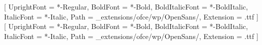 \usepackage{titlepic}
\usepackage{titling}
\usepackage{graphicx}
\usepackage{fancyhdr}
\usepackage{fontspec}
\usepackage{placeins}
\usepackage{graphbox}
\usepackage{tikz}
\usepackage{geometry}
\usepackage{xcolor}
\usepackage{amsmath}
\usepackage[some]{background}
\usepackage{lipsum}
\usepackage{caption}
\usepackage{datetime}
\usepackage{xstring}
 
\setmainfont{OpenSans}[
  UprightFont = {*-Regular},
  BoldFont = {*-Bold},
  BoldItalicFont = {*-BoldItalic},
  ItalicFont = {*-Italic},
  Path = {_extensions/ofce/wp/OpenSans/},
  Extension = {.ttf}
]
\setsansfont{OpenSans}[
  UprightFont = {*-Regular},
  BoldFont = {*-Bold},
  BoldItalicFont = {*-BoldItalic},
  ItalicFont = {*-Italic},
  Path = {_extensions/ofce/wp/OpenSans/},
  Extension = {.ttf}
]
\def\getYear#1{\StrLeft{#1}{4}}
\def\getMonth#1{\StrMid{#1}{6}{7}}
\def\getDay#1{\StrRight{#1}{2}}

\def\jolimois#1{\monthname{\getMonth{#1}}}